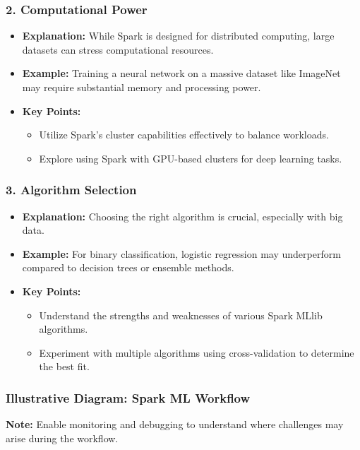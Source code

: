 \documentclass[aspectratio=169]{beamer}
\begin{document}
\begin{frame}[fragile]
    \frametitle{2. Computational Power}
    \begin{itemize}
        \item \textbf{Explanation:} While Spark is designed for distributed computing, large datasets can stress computational resources.
        \item \textbf{Example:} Training a neural network on a massive dataset like ImageNet may require substantial memory and processing power.
        \item \textbf{Key Points:}
        \begin{itemize}
            \item Utilize Spark's cluster capabilities effectively to balance workloads.
            \item Explore using Spark with GPU-based clusters for deep learning tasks.
        \end{itemize}
    \end{itemize}
\end{frame}

\begin{frame}[fragile]
    \frametitle{3. Algorithm Selection}
    \begin{itemize}
        \item \textbf{Explanation:} Choosing the right algorithm is crucial, especially with big data.
        \item \textbf{Example:} For binary classification, logistic regression may underperform compared to decision trees or ensemble methods.
        \item \textbf{Key Points:}
        \begin{itemize}
            \item Understand the strengths and weaknesses of various Spark MLlib algorithms.
            \item Experiment with multiple algorithms using cross-validation to determine the best fit.
        \end{itemize}
    \end{itemize}
\end{frame}

\begin{frame}[fragile]
    \frametitle{Illustrative Diagram: Spark ML Workflow}
    \begin{center}
    \end{center}
    \textbf{Note:} Enable monitoring and debugging to understand where challenges may arise during the workflow.
\end{frame}
\end{document}
